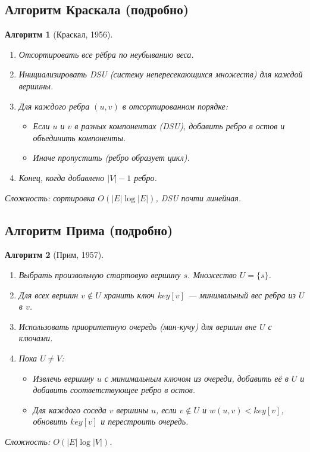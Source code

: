 \documentclass[12pt]{article}
\newtheorem{algorithm}{Алгоритм}
\begin{document}
\begin{enumerate}
\subsection{Алгоритм Краскала (подробно)}
\begin{algorithm}[Краскал, 1956]
    \begin{enumerate}
        \item Отсортировать все рёбра по неубыванию веса.
        \item Инициализировать DSU (систему непересекающихся множеств) для каждой вершины.
        \item Для каждого ребра \((u,v)\) в отсортированном порядке:
            \begin{itemize}
                \item Если \(u\) и \(v\) в разных компонентах (DSU), добавить ребро в остов и объединить компоненты.
                \item Иначе пропустить (ребро образует цикл).
            \end{itemize}
        \item Конец, когда добавлено \(|V|-1\) ребро.
    \end{enumerate}
    Сложность: сортировка \(O(|E|\log|E|)\), DSU почти линейная.
\end{algorithm}

\subsection{Алгоритм Прима (подробно)}
\begin{algorithm}[Прим, 1957]
    \begin{enumerate}
        \item Выбрать произвольную стартовую вершину \(s\). Множество \(U = \{s\}\).
        \item Для всех вершин \(v \notin U\) хранить ключ \(key[v]\) — минимальный вес ребра из \(U\) в \(v\).
        \item Использовать приоритетную очередь (мин-кучу) для вершин вне \(U\) с ключами.
        \item Пока \(U \neq V\):
            \begin{itemize}
                \item Извлечь вершину \(u\) с минимальным ключом из очереди, добавить её в \(U\) и добавить соответствующее ребро в остов.
                \item Для каждого соседа \(v\) вершины \(u\), если \(v \notin U\) и \(w(u,v) < key[v]\), обновить \(key[v]\) и перестроить очередь.
            \end{itemize}
    \end{enumerate}
    Сложность: \(O(|E|\log|V|)\).
\end{algorithm}


\end{enumerate}
\end{document}
